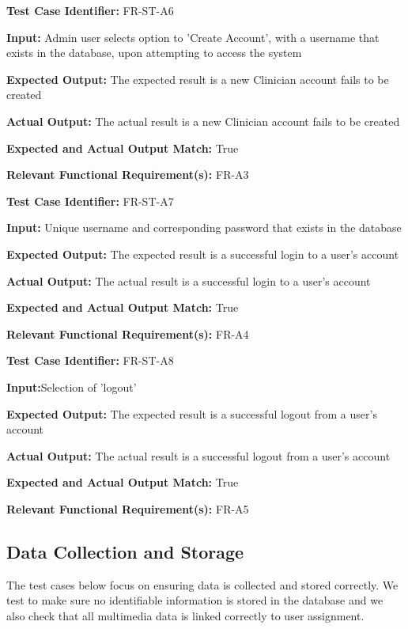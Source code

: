 \documentclass[12pt, titlepage]{article}
\begin{document}
\begin{mdframed}[linewidth=0.5mm] \par
  \textbf{Test Case Identifier:} FR-ST-A6 \par
  \textbf{Input:} Admin user selects option to ’Create Account’, with a username that exists
  in the database, upon attempting to access the system \par
  \textbf{Expected Output:} The expected result is a new Clinician account fails to be created \par
  \textbf{Actual Output:} The actual result is a new Clinician account fails to be created \par
  \textbf{Expected and Actual Output Match:} True \par
  \textbf{Relevant Functional Requirement(s):} FR-A3
\end{mdframed}

\begin{mdframed}[linewidth=0.5mm] \par
  \textbf{Test Case Identifier:} FR-ST-A7 \par
  \textbf{Input:} Unique username and corresponding password that exists in the database \par
  \textbf{Expected Output:} The expected result is a successful login to a user’s account \par
  \textbf{Actual Output:} The actual result is a successful login to a user’s account \par
  \textbf{Expected and Actual Output Match:} True \par
  \textbf{Relevant Functional Requirement(s):} FR-A4
\end{mdframed}

\begin{mdframed}[linewidth=0.5mm] \par
  \textbf{Test Case Identifier:} FR-ST-A8 \par
  \textbf{Input:}Selection of 'logout' \par
  \textbf{Expected Output:} The expected result is a successful logout from a user’s account \par
  \textbf{Actual Output:} The actual result is a successful logout from a user’s account\par
  \textbf{Expected and Actual Output Match:} True \par
  \textbf{Relevant Functional Requirement(s):} FR-A5
\end{mdframed}

\subsection{Data Collection and Storage}
\hspace{2em}The test cases below focus on ensuring data is collected and stored correctly. We test to make sure
no identifiable information is stored in the database and we also check that all multimedia data is linked correctly to user assignment.
\end{document}
